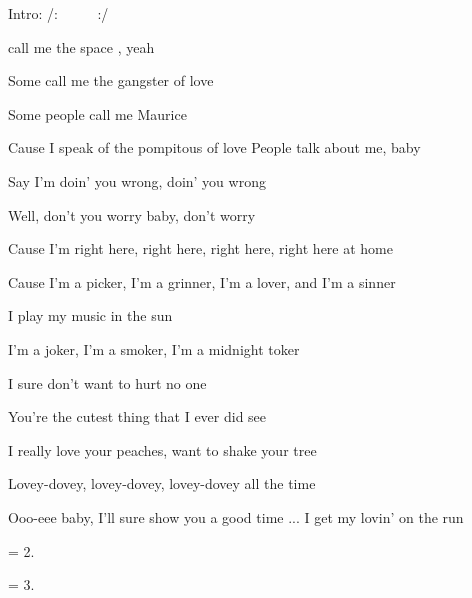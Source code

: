 
Intro: /:  ~  ~  ~  :/

\zs
{}  call me the space , yeah~ ~ 

Some call me the gangster of love

Some people call me Maurice

Cause I speak of the pompitous of love
\ks
\zs
People talk about me, baby

Say I'm doin' you wrong, doin' you wrong

Well, don't you worry baby, don't worry

Cause I'm right here, right here, right here, right here at home
\ks
\zr

Cause I'm a picker, I'm a grinner, I'm a lover, and I'm a sinner

I play my music in the sun
\bigskip

I'm a joker, I'm a smoker, I'm a midnight toker

I sure don't want to hurt no one
\kr

\zs
You're the cutest thing that I ever did see

I really love your peaches, want to shake your tree

Lovey-dovey, lovey-dovey, lovey-dovey all the time

Ooo-eee baby, I'll sure show you a good time
\ks
\zr
... I get my lovin' on the run
\kr

\zr\kr

\zs
= 2.
\ks

\zs
= 3.
\ks
\kp

